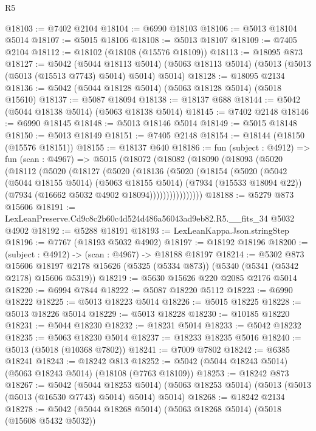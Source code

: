 \begin{lexlean}{R5}
\begin{coremodule}
@18103 := @7402 @2104
@18104 := @6990 @18103
@18106 := @5013 @18104 @5014
@18107 := @5015 @18106
@18108 := @5013 @18107
@18109 := @7405 @2104
@18112 := @18102 (@18108 (@15576 @18109))
@18113 := @18095 @873
@18127 := @5042
    (@5044 @18113 @5014)
    (@5063 @18113 @5014)
    (@5013 (@5013 (@5013 (@15513 @7743) @5014) @5014) @5014)
@18128 := @18095 @2134
@18136 := @5042 (@5044 @18128 @5014) (@5063 @18128 @5014) (@5018 @15610)
@18137 := @5087 @18094
@18138 := @18137 @688
@18144 := @5042 (@5044 @18138 @5014) (@5063 @18138 @5014)
@18145 := @7402 @2148
@18146 := @6990 @18145
@18148 := @5013 @18146 @5014
@18149 := @5015 @18148
@18150 := @5013 @18149
@18151 := @7405 @2148
@18154 := @18144 (@18150 (@15576 @18151))
@18155 := @18137 @640
@18186 := fun (subject : @4912) =>
  fun (scan : @4967) =>
  @5015
    (@18072
      (@18082
        (@18090
          (@18093
            (@5020
              (@18112
                (@5020
                  (@18127
                    (@5020
                      (@18136
                        (@5020
                          (@18154
                            (@5020
                              (@5042
                                (@5044 @18155 @5014)
                                (@5063 @18155 @5014)
                                (@7934 (@15533 @18094 @22))
                                (@7934 (@16662 @5032 @4902 @18094))))))))))))))))
@18188 := @5279 @873 @15606
@18191 := LexLeanPreserve.Cd9c8c2b60c4d524d486a56043ad9eb82.R5.__fits_34 @5032 @4902
@18192 := @5288 @18191
@18193 := LexLeanKappa.Json.stringStep
@18196 := @7767 (@18193 @5032 @4902)
@18197 := @18192 @18196
@18200 := (subject : @4912) -> (scan : @4967) -> @18188 @18197
@18214 := @5302
    @873
    @15606
    @18197
    @2178
    @15626
    (@5325 (@5334 @873))
    (@5340 (@5341 (@5342 @2178) @15606 @5319))
@18219 := @5630 @15626 @220 @2085 @2176 @5014
@18220 := @6994 @7844
@18222 := @5087 @18220 @5112
@18223 := @6990 @18222
@18225 := @5013 @18223 @5014
@18226 := @5015 @18225
@18228 := @5013 @18226 @5014
@18229 := @5013 @18228
@18230 := @10185 @18220
@18231 := @5044 @18230
@18232 := @18231 @5014
@18233 := @5042 @18232
@18235 := @5063 @18230 @5014
@18237 := @18233 @18235 @5016
@18240 := @5013 (@5018 (@10368 @7802))
@18241 := @7009 @7802
@18242 := @6385 @18241
@18243 := @18242 @813
@18252 := @5042 (@5044 @18243 @5014) (@5063 @18243 @5014) (@18108 (@7763 @18109))
@18253 := @18242 @873
@18267 := @5042
    (@5044 @18253 @5014)
    (@5063 @18253 @5014)
    (@5013 (@5013 (@5013 (@16530 @7743) @5014) @5014) @5014)
@18268 := @18242 @2134
@18278 := @5042 (@5044 @18268 @5014) (@5063 @18268 @5014) (@5018 (@15608 @5432 @5032))

\end{coremodule}
\end{lexlean}
